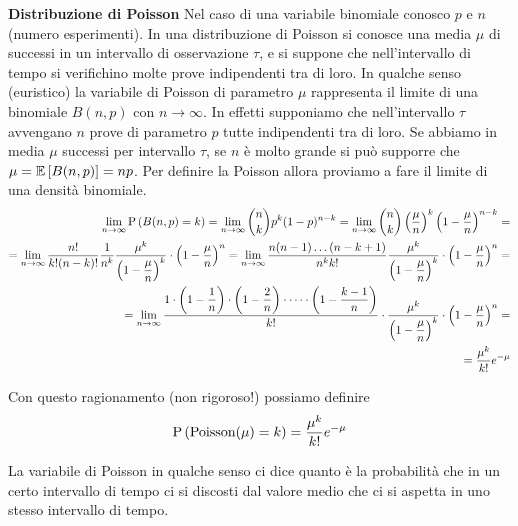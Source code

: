 \begin{defn}
    \textbf{Distribuzione di Poisson}
    Nel caso di una variabile binomiale conosco $ p $ e $ n $ (numero esperimenti).
    In una distribuzione di Poisson si conosce una media $ \mu $ di successi in un intervallo di osservazione $ \tau $, e si suppone che nell'intervallo di tempo si verifichino molte prove indipendenti
	tra di loro. In qualche senso (euristico) la variabile di Poisson di parametro $\mu$ rappresenta
	il limite di una binomiale $B(n,p)$ con $n\rightarrow \infty$. 
	In effetti supponiamo che nell'intervallo $ \tau $ avvengano $ n $ prove di parametro $p$ tutte indipendenti tra di loro. Se abbiamo in media $ \mu $ successi per intervallo $\tau$,
	se $n$ \`e molto grande si pu\`o supporre che $ \mu = \mathbb{E}\left[B(n,p)\right] = np$. Per definire la Poisson
    allora proviamo a fare il limite di una densit\`a binomiale.
    \begin{equation*}
    \begin{aligned}
        \lim_{n\rightarrow\infty}\text{P}\left(B(n,p) = k\right) =\lim_{n\rightarrow\infty} \binom{n}{k}p^k(1-p)^{n-k}
        = \lim_{n\rightarrow\infty} \binom{n}{k} \left(\dfrac{\mu}{n}\right)^k \left(1- \dfrac{\mu}{n}\right)^{n-k}
        = \\
        =\lim_{n\rightarrow\infty}\dfrac{n!}{k!(n-k)!} \dfrac{1}{n^k} \dfrac{\mu^k}{\left(1-\dfrac{\mu}{n}\right)^k} \cdot \left(1-\dfrac{\mu}{n}\right)^n  =
        \lim_{n\rightarrow\infty}\dfrac{n(n-1)\dots (n-k+1)}{n^k k!} \dfrac{\mu^k}{\left(1-\dfrac{\mu}{n}\right)^k} \cdot \left(1-\dfrac{\mu}{n}\right)^n
        = \\
        =\lim_{n\rightarrow\infty} \dfrac{1 \cdot \left(1-\dfrac{1}{n} \right) \cdot \left(1-\dfrac{2}{n}\right) \cdot \dots \cdot \left(1- \dfrac{k-1}{n}\right)}{k!} \cdot \dfrac{\mu^k}{\left(1-\dfrac{\mu}{n}\right)^k} \cdot \left(1-\dfrac{\mu}{n}\right)^n =\\
        = \dfrac{\mu^k}{k!} e^{-\mu}
    \end{aligned}
    \end{equation*}

	Con questo ragionamento (non rigoroso!) possiamo definire
    \begin{equation}
    \text{P}\left(\text{Poisson}(\mu) = k\right) = \dfrac{\mu^k}{k!} e^{-\mu}
    \end{equation}

\end{defn}

La variabile di Poisson in qualche senso ci dice quanto \`e la probabilit\`a che in un certo intervallo di
tempo ci si discosti dal valore medio che ci si aspetta in uno stesso intervallo di tempo.

